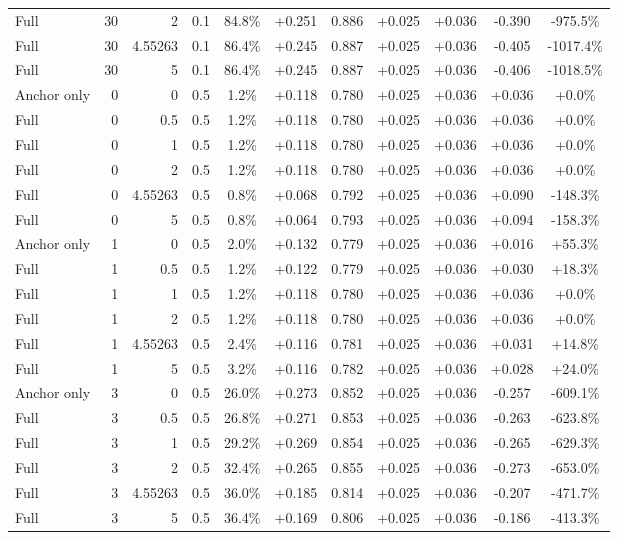 \begin{table}[htbp]
\begin{tabular}{lrrrccccccc}
Full & 30 & 2 & 0.1 & 84.8\% & +0.251 & 0.886 & +0.025 & +0.036 & -0.390 & -975.5\% \\
Full & 30 & 4.55263 & 0.1 & 86.4\% & +0.245 & 0.887 & +0.025 & +0.036 & -0.405 & -1017.4\% \\
Full & 30 & 5 & 0.1 & 86.4\% & +0.245 & 0.887 & +0.025 & +0.036 & -0.406 & -1018.5\% \\
Anchor only & 0 & 0 & 0.5 & 1.2\% & +0.118 & 0.780 & +0.025 & +0.036 & +0.036 & +0.0\% \\
Full & 0 & 0.5 & 0.5 & 1.2\% & +0.118 & 0.780 & +0.025 & +0.036 & +0.036 & +0.0\% \\
Full & 0 & 1 & 0.5 & 1.2\% & +0.118 & 0.780 & +0.025 & +0.036 & +0.036 & +0.0\% \\
Full & 0 & 2 & 0.5 & 1.2\% & +0.118 & 0.780 & +0.025 & +0.036 & +0.036 & +0.0\% \\
Full & 0 & 4.55263 & 0.5 & 0.8\% & +0.068 & 0.792 & +0.025 & +0.036 & +0.090 & -148.3\% \\
Full & 0 & 5 & 0.5 & 0.8\% & +0.064 & 0.793 & +0.025 & +0.036 & +0.094 & -158.3\% \\
Anchor only & 1 & 0 & 0.5 & 2.0\% & +0.132 & 0.779 & +0.025 & +0.036 & +0.016 & +55.3\% \\
Full & 1 & 0.5 & 0.5 & 1.2\% & +0.122 & 0.779 & +0.025 & +0.036 & +0.030 & +18.3\% \\
Full & 1 & 1 & 0.5 & 1.2\% & +0.118 & 0.780 & +0.025 & +0.036 & +0.036 & +0.0\% \\
Full & 1 & 2 & 0.5 & 1.2\% & +0.118 & 0.780 & +0.025 & +0.036 & +0.036 & +0.0\% \\
Full & 1 & 4.55263 & 0.5 & 2.4\% & +0.116 & 0.781 & +0.025 & +0.036 & +0.031 & +14.8\% \\
Full & 1 & 5 & 0.5 & 3.2\% & +0.116 & 0.782 & +0.025 & +0.036 & +0.028 & +24.0\% \\
Anchor only & 3 & 0 & 0.5 & 26.0\% & +0.273 & 0.852 & +0.025 & +0.036 & -0.257 & -609.1\% \\
Full & 3 & 0.5 & 0.5 & 26.8\% & +0.271 & 0.853 & +0.025 & +0.036 & -0.263 & -623.8\% \\
Full & 3 & 1 & 0.5 & 29.2\% & +0.269 & 0.854 & +0.025 & +0.036 & -0.265 & -629.3\% \\
Full & 3 & 2 & 0.5 & 32.4\% & +0.265 & 0.855 & +0.025 & +0.036 & -0.273 & -653.0\% \\
Full & 3 & 4.55263 & 0.5 & 36.0\% & +0.185 & 0.814 & +0.025 & +0.036 & -0.207 & -471.7\% \\
Full & 3 & 5 & 0.5 & 36.4\% & +0.169 & 0.806 & +0.025 & +0.036 & -0.186 & -413.3\% \\

\end{tabular}
\end{table}
